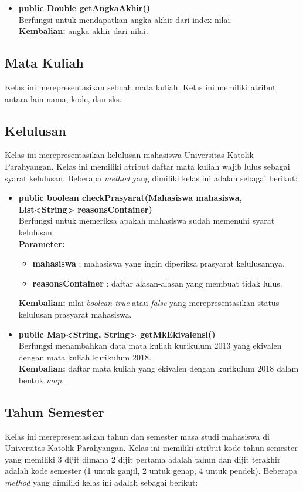\begin{itemize}
	\item \textbf{public Double getAngkaAkhir()} \\
		Berfungsi untuk mendapatkan angka akhir dari index nilai. \\
		\textbf{Kembalian:} angka akhir dari nilai.	
\end{itemize}

\subsection{Mata Kuliah}
Kelas ini merepresentasikan sebuah mata kuliah. Kelas ini memiliki atribut antara lain nama, kode, dan sks.

\subsection{Kelulusan}
Kelas ini merepresentasikan kelulusan mahasiswa Universitas Katolik Parahyangan. Kelas ini memiliki atribut daftar mata kuliah wajib lulus sebagai syarat kelulusan. Beberapa \textit{method} yang dimiliki kelas ini adalah sebagai berikut:

\begin{itemize}
	\item \textbf{public boolean checkPrasyarat(Mahasiswa mahasiswa, List<String> reasonsContainer)} \\
		Berfungsi untuk memeriksa apakah mahasiswa sudah memenuhi syarat kelulusan. \\
		\textbf{Parameter:} 
		\begin{itemize}
			\item \textbf{mahasiswa} : mahasiswa yang ingin diperiksa prasyarat kelulusannya.
			\item \textbf{reasonsContainer} : daftar alasan-alasan yang membuat tidak lulus.
		\end{itemize}
		\textbf{Kembalian:} nilai \textit{boolean true} atau \textit{false} yang merepresentasikan status kelulusan prasyarat mahasiswa.	
	\item \textbf{public Map<String, String> getMkEkivalensi()}\\
	    Berfungsi menambahkan data mata kuliah kurikulum 2013 yang ekivalen dengan mata kuliah kurikulum 2018. \\
	    \textbf{Kembalian:} daftar mata kuliah yang ekivalen dengan kurikulum 2018 dalam bentuk \textit{map.}
\end{itemize}

\subsection{Tahun Semester}
Kelas ini merepresentasikan tahun dan semester masa studi mahasiswa di Universitas Katolik Parahyangan. Kelas ini memiliki atribut kode tahun semester yang memiliki 3 dijit dimana 2 dijit pertama adalah tahun dan dijit terakhir adalah kode semester (1 untuk ganjil, 2 untuk genap, 4 untuk pendek). Beberapa \textit{method} yang dimiliki kelas ini adalah sebagai berikut:

